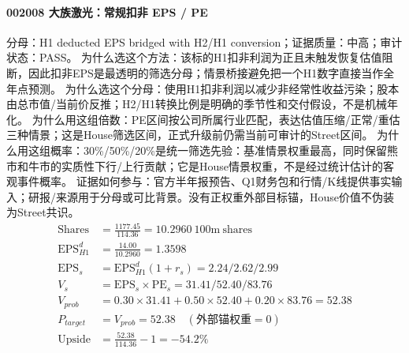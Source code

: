\paragraph{002008 大族激光：常规扣非 EPS / PE}
分母：H1 deducted EPS bridged with H2/H1 conversion；证据质量：中高；审计状态：PASS。
为什么选这个方法：该标的H1扣非利润为正且未触发恢复估值阻断，因此扣非EPS是最透明的筛选分母；情景桥接避免把一个H1数字直接当作全年点预测。
为什么选这个分母：使用H1扣非利润以减少非经常性收益污染；股本由总市值/当前价反推；H2/H1转换比例是明确的季节性和交付假设，不是机械年化。
为什么用这组倍数：PE区间按公司所属行业匹配，表达估值压缩/正常/重估三种情景；这是House筛选区间，正式升级前仍需当前可审计的Street区间。
为什么用这组概率：30\%/50\%/20\%是统一筛选先验：基准情景权重最高，同时保留熊市和牛市的实质性下行/上行贡献；它是House情景权重，不是经过统计估计的客观事件概率。
证据如何参与：官方半年报预告、Q1财务包和行情/K线提供事实输入；研报/来源用于分母或可比背景。没有正权重外部目标锚，House价值不伪装为Street共识。
\begin{align*}
\mathrm{Shares} &= \frac{1177.45}{114.36}=10.2960\ \mathrm{100m\ shares}\\
\mathrm{EPS}_{H1}^d &= \frac{14.00}{10.2960}=1.3598\\
\mathrm{EPS}_s &= \mathrm{EPS}_{H1}^d(1+r_s)=2.24/2.62/2.99\\
V_s &= \mathrm{EPS}_s\times \mathrm{PE}_s=31.41/52.40/83.76\\
V_{prob} &= 0.30\times 31.41+0.50\times 52.40+0.20\times 83.76=52.38\\
P_{target} &= V_{prob}=52.38\quad(\text{外部锚权重}=0)\\
\mathrm{Upside} &= \frac{52.38}{114.36}-1=-54.2\%\\
\end{align*}

